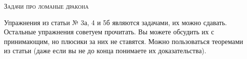 
\centerline{\textsc{\Large Задачи про ломаные дракона}}

Упражнения из статьи № 3а, 4 и 5б являются задачами,  их можно сдавать. Остальные упражнения  советуем прочитать. Вы можете обсудить их с принимающим, но плюсики за них не ставятся.
Можно пользоваться теоремами из статьи (даже если вы не до конца понимаете их доказательства).








